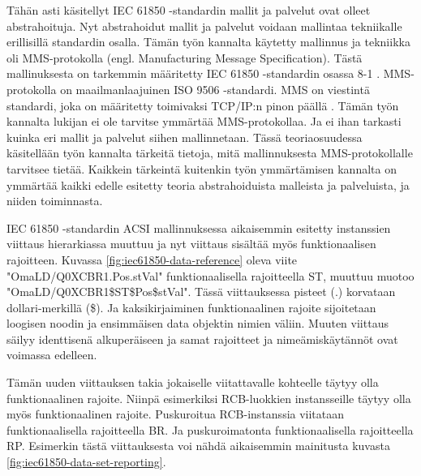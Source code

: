 Tähän asti käsitellyt IEC 61850 -standardin mallit ja palvelut ovat olleet abstrahoituja. Nyt abstrahoidut mallit ja palvelut voidaan mallintaa tekniikalle erillisillä standardin osalla. Tämän työn kannalta käytetty mallinnus ja tekniikka oli MMS-protokolla (engl. Manufacturing Message Specification). Tästä mallinuksesta on tarkemmin määritetty IEC 61850 -standardin osassa 8-1 \cite{IEC61850-8-1}. MMS-protokolla on maailmanlaajuinen ISO 9506 -standardi. MMS on viestintä standardi, joka on määritetty toimivaksi TCP/IP:n pinon päällä \cite{MMS-protocol-stack-and-API}. Tämän työn kannalta lukijan ei ole tarvitse ymmärtää MMS-protokollaa. Ja ei ihan tarkasti kuinka eri mallit ja palvelut siihen mallinnetaan. Tässä teoriaosuudessa käsitellään työn kannalta tärkeitä tietoja, mitä mallinnuksesta MMS-protokollalle tarvitsee tietää. Kaikkein tärkeintä kuitenkin työn ymmärtämisen kannalta on ymmärtää kaikki edelle esitetty teoria abstrahoiduista malleista ja palveluista, ja niiden toiminnasta. \cite{Introduction-to-the-MMS}

IEC 61850 -standardin ACSI mallinnuksessa aikaisemmin esitetty instanssien viittaus hierarkiassa muuttuu ja nyt viittaus sisältää myös funktionaalisen rajoitteen. Kuvassa \ref{fig:iec61850-data-reference} oleva viite "OmaLD/Q0XCBR1.Pos.stVal" funktionaalisella rajoitteella ST, muuttuu muotoo "OmaLD/Q0XCBR1\$ST\$Pos\$stVal". Tässä viittauksessa pisteet (.) korvataan dollari-merkillä (\$). Ja kaksikirjaiminen funktionaalinen rajoite sijoitetaan loogisen noodin ja ensimmäisen data objektin nimien väliin. Muuten viittaus säilyy identtisenä alkuperäiseen ja samat rajoitteet ja nimeämiskäytännöt ovat voimassa edelleen. \cite[s.~34--35, 111]{IEC61850-8-1}

Tämän uuden viittauksen takia jokaiselle viitattavalle kohteelle täytyy olla funktionaalinen rajoite. Niinpä esimerkiksi RCB-luokkien instansseille täytyy olla myös funktionaalinen rajoite. Puskuroitua RCB-instanssia viitataan funktionaalisella rajoitteella BR. Ja puskuroimatonta funktionaalisella rajoitteella RP. Esimerkin tästä viittauksesta voi nähdä aikaisemmin mainitusta kuvasta \ref{fig:iec61850-data-set-reporting}. \cite[s.~32--34, 75]{IEC61850-8-1}


